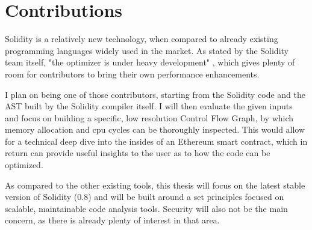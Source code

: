 \chapter{Contributions}

Solidity is a relatively new technology, when compared to already existing programming languages widely used in the market. As stated by the Solidity team itself, "the optimizer is under heavy development" \cite{solidity-optimizer}, which gives plenty of room for contributors to bring their own performance enhancements.

I plan on being one of those contributors, starting from the Solidity code and the AST built by the Solidity compiler itself. I will then evaluate the given inputs and focus on building a specific, low resolution Control Flow Graph, by which memory allocation and cpu cycles can be thoroughly inspected. This would allow for a technical deep dive into the insides of an Ethereum smart contract, which in return can provide useful insights to the user as to how the code can be optimized.

As compared to the other existing tools, this thesis will focus on the latest stable version of Solidity (0.8) and will be built around a set principles focused on scalable, maintainable code analysis tools. Security will also not be the main concern, as there is already plenty of interest in that area.